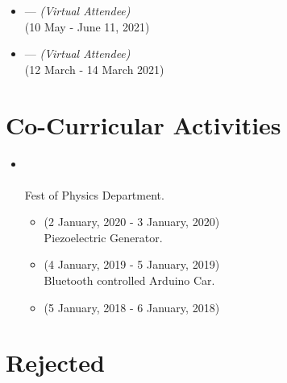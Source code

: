 \documentclass{My_CV}
\begin{document}
\begin{paracol}{2}
\begin{rightcolumn}
\begin{itemize}
    \item {} — \textit{(Virtual Attendee)} \\
     \hfill{(10 May - June 11, 2021)}
    
    \item {} — \textit{(Virtual Attendee)} \\
     \hfill{(12 March - 14 March 2021)}
    
\end{itemize}



\section{{\faInstitution} Co-Curricular Activities}

\begin{itemize}
    \item {} \\
     \\
    Fest of Physics Department. \\
    
    \begin{itemize}
    
        \item {} \hfill{(2 January, 2020 - 3 January, 2020)} \\
         Piezoelectric Generator.
        
        \item {} \hfill{(4 January, 2019 - 5 January, 2019)} \\
         Bluetooth controlled Arduino Car.
        
        \item {} \hfill{(5 January, 2018 - 6 January, 2018)}

    \end{itemize}

\end{itemize}



\section{{\faTags} Rejected}


\end{rightcolumn}
\end{paracol}
\end{document}
